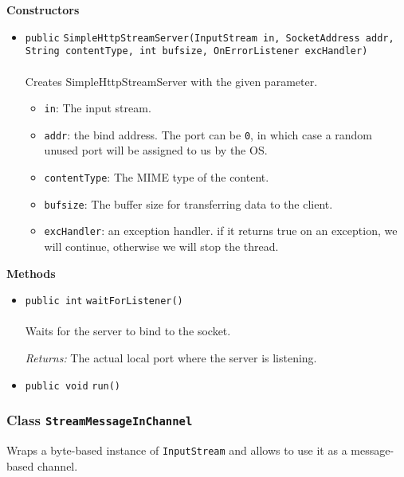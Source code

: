 \textbf{\sffamily Constructors}
\begin{itemize}
\item \lstinline|public| \lstinline|SimpleHttpStreamServer|\lstinline|(InputStream in, SocketAddress addr, String contentType, int bufsize, OnErrorListener excHandler)|\\ \\[-0.6em]
Creates SimpleHttpStreamServer with the given parameter.
\begin{itemize}
\item \lstinline|in|: The input stream.
\item \lstinline|addr|: the bind address. The port can be \lstinline|0|, in which
 case a random unused port will be assigned to us by the OS.
\item \lstinline|contentType|: The MIME type of the content.
\item \lstinline|bufsize|: The buffer size for transferring data to the client.
\item \lstinline|excHandler|: an exception handler. if it returns true on an exception,
                   we will continue, otherwise we will stop the thread.
\end{itemize}



\end{itemize}


\textbf{\sffamily Methods}
\begin{itemize}
\item \lstinline|public int| \lstinline|waitForListener|\lstinline|()|\\ \\[-0.6em]
Waits for the server to bind to the socket.

\emph{Returns:} The actual local port where the server is listening.

\item \lstinline|public void| \lstinline|run|\lstinline|()| \\[-0.6em]




\end{itemize}

\subsubsection{Class \lstinline|StreamMessageInChannel|}
Wraps a byte-based instance of \lstinline|InputStream| and allows to use it as a
 message-based channel. \\
\noindent\begin{minipage}[t]{5cm}
\vspace{0.3em}
\hspace*{2em}
\vspace{0.3em}
\end{minipage}



